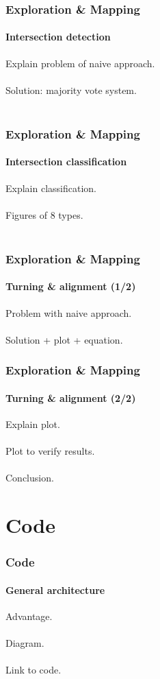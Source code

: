 \documentclass{beamer}
\begin{document}

\begin{frame}
\frametitle{Exploration \& Mapping}
\framesubtitle{Intersection detection}
Explain problem of naive approach.\\~\\
Solution: majority vote system.\\~\\
\end{frame}


\begin{frame}
\frametitle{Exploration \& Mapping}
\framesubtitle{Intersection classification}
Explain classification.\\~\\
Figures of 8 types.\\~\\
\end{frame}


\begin{frame}
\frametitle{Exploration \& Mapping}
\framesubtitle{Turning \& alignment (1/2)}
Problem with naive approach.\\~\\
Solution + plot + equation.
\end{frame}


\begin{frame}
\frametitle{Exploration \& Mapping}
\framesubtitle{Turning \& alignment (2/2)}
Explain plot.\\~\\
Plot to verify results.\\~\\
Conclusion.
\end{frame}

\section{Code} 

\begin{frame}
\frametitle{Code}
\framesubtitle{General architecture}
Advantage.\\~\\
Diagram.\\~\\
Link to code.\\~\\
\end{frame}
\end{document}
